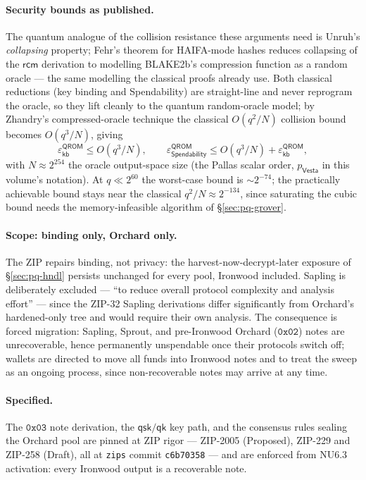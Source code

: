 \documentclass[11pt,a4paper]{article}
\theoremstyle{definition}
\newcommand{\Vesta}{\ensuremath{\mathsf{Vesta}}}
\newcommand{\rcm}{\ensuremath{\mathsf{rcm}}}
\begin{document}
\paragraph{Security bounds as published.} The quantum analogue of the
collision resistance these arguments need is Unruh's \emph{collapsing}
property; Fehr's theorem for HAIFA-mode hashes reduces collapsing of the
$\rcm$ derivation to modelling BLAKE2b's compression function as a random
oracle --- the same modelling the classical proofs already use. Both classical
reductions (key binding and Spendability) are straight-line and never
reprogram the oracle, so they lift cleanly to the quantum random-oracle model;
by Zhandry's compressed-oracle technique the classical $O(q^2/N)$ collision
bound becomes $O(q^3/N)$, giving
\[
\varepsilon^{\mathsf{QROM}}_{\mathsf{kb}} \le O(q^3/N), \qquad
\varepsilon^{\mathsf{QROM}}_{\mathsf{Spendability}} \le O(q^3/N) +
\varepsilon^{\mathsf{QROM}}_{\mathsf{kb}},
\]
with $N \approx 2^{254}$ the oracle output-space size (the Pallas scalar
order, $p_{\Vesta}$ in this volume's notation). At $q \ll 2^{60}$ the
worst-case bound is ${\sim}2^{-74}$; the practically achievable bound stays
near the classical $q^2/N \approx 2^{-134}$, since saturating the cubic bound
needs the memory-infeasible algorithm of \S\ref{sec:pq-grover}.

\paragraph{Scope: binding only, Orchard only.} The ZIP repairs binding, not
privacy: the harvest-now-decrypt-later exposure of \S\ref{sec:pq-hndl}
persists unchanged for every pool, Ironwood included. Sapling is deliberately
excluded --- ``to reduce overall protocol complexity and analysis effort'' ---
since the ZIP-32 Sapling derivations differ significantly from Orchard's
hardened-only tree and would require their own analysis. The consequence is
forced migration:
Sapling, Sprout, and pre-Ironwood Orchard ($\mathtt{0x02}$) notes are
unrecoverable, hence permanently unspendable once their protocols switch off;
wallets are directed to move all funds into Ironwood notes and to treat the
sweep as an ongoing process, since non-recoverable notes may arrive at any
time.

\paragraph{Specified.} The $\mathtt{0x03}$ note derivation, the
$\mathsf{qsk}/\mathsf{qk}$ key path, and the consensus rules sealing the
Orchard pool are pinned at ZIP rigor --- ZIP-2005 (Proposed), ZIP-229 and
ZIP-258 (Draft), all at \texttt{zips} commit \texttt{c6b70358} --- and are
enforced from NU6.3 activation: every Ironwood output is a recoverable note.
\end{document}
